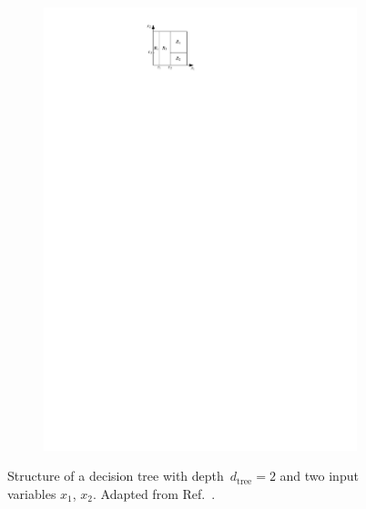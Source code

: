 \begin{figure}[htb]
\begin{subfigure}[t]{0.4\textwidth}
    \includegraphics{./figures/theory/decision_tree_partition.pdf}
    \label{fig:decision_tree_partition}
  \end{subfigure}
  \caption{Structure of a decision tree with depth~$d_\text{tree} = 2$ and two
    input variables $x_1$, $x_2$. Adapted from Ref.~\cite{esl}.}
  \label{fig:decision_tree}
\end{figure}

